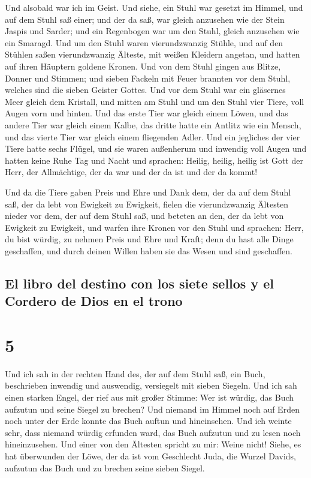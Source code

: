  Und alsobald war ich im Geist. Und siehe, ein Stuhl war
gesetzt im Himmel, und auf dem Stuhl saß einer;  und der
da saß, war gleich anzusehen wie der Stein Jaspis und Sarder; und ein
Regenbogen war um den Stuhl, gleich anzusehen wie ein Smaragd.
 Und um den Stuhl waren vierundzwanzig Stühle, und auf den
Stühlen saßen vierundzwanzig Älteste, mit weißen Kleidern angetan, und
hatten auf ihren Häuptern goldene Kronen.  Und von dem
Stuhl gingen aus Blitze, Donner und Stimmen; und sieben Fackeln mit
Feuer brannten vor dem Stuhl, welches sind die sieben Geister Gottes.
 Und vor dem Stuhl war ein gläsernes Meer gleich dem
Kristall, und mitten am Stuhl und um den Stuhl vier Tiere, voll Augen
vorn und hinten.  Und das erste Tier war gleich einem
Löwen, und das andere Tier war gleich einem Kalbe, das dritte hatte ein
Antlitz wie ein Mensch, und das vierte Tier war gleich einem fliegenden
Adler.  Und ein jegliches der vier Tiere hatte sechs
Flügel, und sie waren außenherum und inwendig voll Augen und hatten
keine Ruhe Tag und Nacht und sprachen: Heilig, heilig, heilig ist Gott
der Herr, der Allmächtige, der da war und der da ist und der da kommt!

 Und da die Tiere gaben Preis und Ehre und Dank dem, der
da auf dem Stuhl saß, der da lebt von Ewigkeit zu Ewigkeit,
 fielen die vierundzwanzig Ältesten nieder vor dem, der
auf dem Stuhl saß, und beteten an den, der da lebt von Ewigkeit zu
Ewigkeit, und warfen ihre Kronen vor den Stuhl und sprachen:
 Herr, du bist würdig, zu nehmen Preis und Ehre und
Kraft; denn du hast alle Dinge geschaffen, und durch deinen Willen haben
sie das Wesen und sind geschaffen.

\hypertarget{el-libro-del-destino-con-los-siete-sellos-y-el-cordero-de-dios-en-el-trono}{%
\subsection{El libro del destino con los siete sellos y el Cordero de
Dios en el
trono}\label{el-libro-del-destino-con-los-siete-sellos-y-el-cordero-de-dios-en-el-trono}}

\hypertarget{section-4}{%
\section{5}\label{section-4}}

 Und ich sah in der rechten Hand des, der auf dem Stuhl
saß, ein Buch, beschrieben inwendig und auswendig, versiegelt mit sieben
Siegeln.  Und ich sah einen starken Engel, der rief aus
mit großer Stimme: Wer ist würdig, das Buch aufzutun und seine Siegel zu
brechen?  Und niemand im Himmel noch auf Erden noch unter
der Erde konnte das Buch auftun und hineinsehen.  Und ich
weinte sehr, dass niemand würdig erfunden ward, das Buch aufzutun und zu
lesen noch hineinzusehen.  Und einer von den Ältesten
spricht zu mir: Weine nicht! Siehe, es hat überwunden der Löwe, der da
ist vom Geschlecht Juda, die Wurzel Davids, aufzutun das Buch und zu
brechen seine sieben Siegel.

